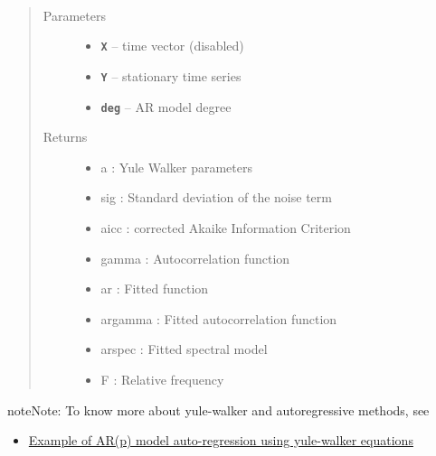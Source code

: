 \documentclass[letterpaper,10pt,english]{sphinxmanual}
\begin{document}
\begin{fulllineitems}
\label{altimetry.tools.spectrum:altimetry.tools.spectrum.yule_walker_regression}~\begin{quote}\begin{description}
\item[{Parameters}] \leavevmode\begin{itemize}
\item {} 
\textbf{\texttt{X}} -- time vector (disabled)

\item {} 
\textbf{\texttt{Y}} -- stationary time series

\item {} 
\textbf{\texttt{deg}} -- AR model degree

\end{itemize}

\item[{Returns}] \leavevmode
\begin{itemize}
\item {} 
a : Yule Walker parameters

\item {} 
sig : Standard deviation of the noise term

\item {} 
aicc : corrected Akaike Information Criterion

\item {} 
gamma : Autocorrelation function

\item {} 
ar : Fitted function

\item {} 
argamma : Fitted autocorrelation function

\item {} 
arspec : Fitted spectral model

\item {} 
F : Relative frequency

\end{itemize}


\end{description}\end{quote}

\begin{notice}{note}{Note:}
To know more about yule-walker and autoregressive methods, see
\begin{itemize}
\item {} 
\href{http://www-ssc.igpp.ucla.edu/personnel/russell/ESS265/Ch9/autoreg/node7.html}{Example of AR(p) model auto-regression using yule-walker equations}


\end{itemize}
\end{notice}
\end{fulllineitems}
\end{document}
